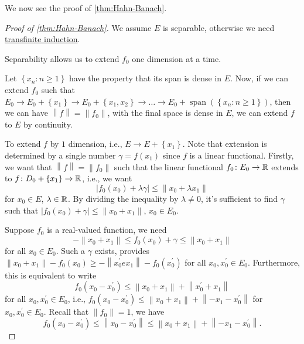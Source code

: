 
We now see the proof of \autoref{thm:Hahn-Banach}.
\begin{proof}[Proof of \autoref{thm:Hahn-Banach}]
	We assume \(E\) is separable, otherwise we need \href{https://en.wikipedia.org/wiki/Transfinite_induction}{transfinite induction}.
	\begin{note}
		Separability allows us to extend \(f_0\) one dimension at a time.
	\end{note}
	Let \(\left\{ x_{n}\colon n \geq 1 \right\} \) have the property that its span is dense in \(E\). Now, if we can extend \(f_0\) such that \(E_0 \to E_0 + \left\{ x_1 \right\} \to E_0 + \left\{ x_1, x_2 \right\} \to \ldots \to E_0 + \mathop{\mathrm{span}}(\left\{ x_n\colon n \geq 1 \right\} ) \), then we can have \(\left\lVert f\right\rVert = \left\lVert f_0\right\rVert \), with the final space is dense in \(E\), we can extend \(f\) to \(E\) by continuity.

	To extend \(f\) by \(1\) dimension, i.e., \(E \to E + \left\{ x_1 \right\} \). Note that extension is determined by a single number \(\gamma = f(x_1)\) since \(f\) is a linear functional. Firstly, we want that \(\left\lVert f\right\rVert = \left\lVert f_0\right\rVert \) such that the linear functional \(f_0 \colon E_0 \to \mathbb{\MakeUppercase{r}} \) extends to \(f\colon D_0 + \left\{ x_1 \right\} \to \mathbb{\MakeUppercase{r}} \), i.e., we want
	\[
		\left\vert f_0 (x_0) + \lambda \gamma \right\vert \leq \left\lVert x_0 + \lambda  x_1\right\rVert
	\]
	for \(x_ 0 \in E\), \(\lambda \in \mathbb{\MakeUppercase{r}} \). By dividing the inequality by \(\lambda \neq 0\), it's sufficient to find \(\gamma \) such that \(\left\vert f_0(x_0) + \gamma  \right\vert \leq \left\lVert x_0 + x_1\right\rVert  \), \(x_0 \in E_0\).

	Suppose \(f_0\) is a real-valued function, we need
	\[
		- \left\lVert x_0 + x_1\right\rVert \leq f_0(x_0) + \gamma \leq \left\lVert x_0 + x_1\right\rVert
	\]
	for all \(x_0 \in E_0\). Such a \(\gamma \) exists, provides \(\left\lVert x_0 + x_1\right\rVert - f_0(x_0) \geq -\left\lVert x_0^\prime e x_1\right\rVert - f_0(x_0^\prime )\) for all \(x_0, x_0^\prime \in E_0\). Furthermore, this is equivalent to write
	\[
		f_0(x_0 - x_0^\prime ) \leq \left\lVert x_0 + x_1\right\rVert + \left\lVert x_0^\prime + x_1\right\rVert
	\]
	for all \(x_0, x_0^\prime \in E_0\), i.e., \(f_0(x_0 - x_0^\prime ) \leq \left\lVert x_0 + x_1\right\rVert + \left\lVert - x_1 - x_0^\prime \right\rVert \) for \(x_0, x_0^\prime \in E_0\). Recall that \(\left\lVert f_0\right\rVert = 1\), we have
	\[
		f_0(x_0 - x_0^\prime ) \leq \left\lVert x_0 - x_0^\prime \right\rVert \leq \left\lVert x_0 + x_1\right\rVert + \left\lVert -x_1 - x_0^\prime \right\rVert.
	\]


\end{proof}

